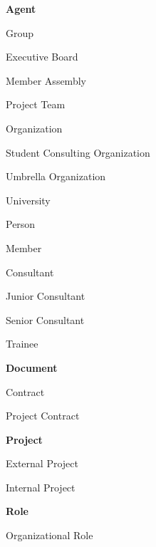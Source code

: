 \documentclass[a4paper, DIV=13, BCOR=0cm]{scrbook}
\begin{document}
\begin{multicols}{2}
	\begin{compactitem}
		\item \textbf{Agent}
		\begin{compactitem}
			\item Group
			\begin{compactitem}
				\item Executive Board
				\item Member Assembly
				\item Project Team
			\end{compactitem}
			\item Organization
			\begin{compactitem}
				\item Student Consulting Organization
				\item Umbrella Organization
				\item University
			\end{compactitem}
			\item Person
			\begin{compactitem}
				\item Member
				\begin{compactitem}
					\item Consultant
					\item Junior Consultant
					\item Senior Consultant
					\item Trainee
				\end{compactitem}
			\end{compactitem}
		\end{compactitem}
		\item \textbf{Document}
		\begin{compactitem}
			\item Contract
			\begin{compactitem}
				\item Project Contract
			\end{compactitem}
		\end{compactitem}
		\item \textbf{Project}
		\begin{compactitem}
			\item External Project
			\item Internal Project
		\end{compactitem}
		\item \textbf{Role}
		\begin{compactitem}
			\item Organizational Role

\end{compactitem}
\end{compactitem}
\end{multicols}
\end{document}
